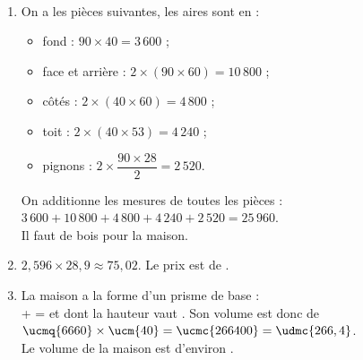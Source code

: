    \ \\ [-5mm]
   \begin{enumerate}
      \item On a les pièces suivantes, les aires sont en \ucmq{} :
         \begin{itemize}
            \item fond : $90\times40 =3\,600$ ;
            \item face et arrière : $2\times(90\times60) =10\,800$ ;
            \item côtés : $2\times(40\times60) =4\,800$ ;
            \item toit : $2\times(40\times53) =4\,240$ ; \smallskip
            \item pignons : $2\times\dfrac{90\times28}{2} =2\,520$. \smallskip
         \end{itemize}
         On additionne les mesures de toutes les pièces : \\
         $3\,600+10\,800+4\,800+4\,240+2\,520 =25\,960$. \\
         {\blue Il faut  de bois pour la maison}.
      \item $2,596\times28,9 \approx75,02$.
      {\blue Le prix est de \approx{}}.
      \item La maison a la forme d'un prisme de base : \\
       +  =  et dont la hauteur vaut . Son volume est donc de $\ucmq{6660}\times\ucm{40} =\ucmc{266400} =\udmc{266,4}$. \\
      {\blue Le volume de la maison est d'environ }.
   \end{enumerate}
